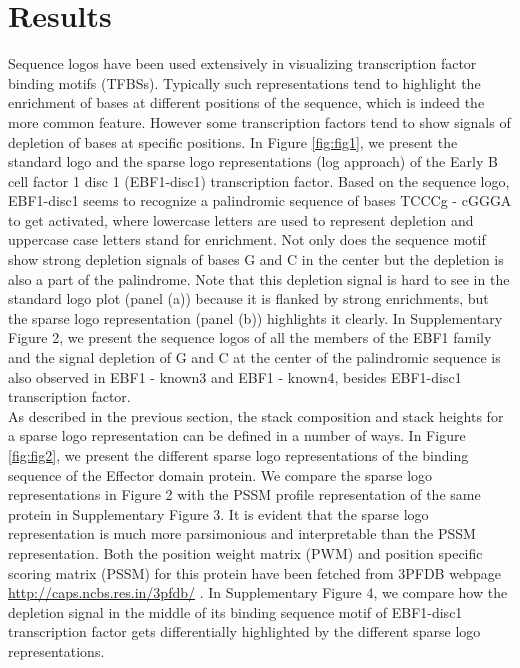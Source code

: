 \documentclass{bmcart}
\begin{document}
\section*{Results}

Sequence logos have been used extensively in visualizing transcription factor binding motifs (TFBSs). Typically such representations tend to highlight the enrichment of bases at different positions of the sequence, which is indeed the more common feature. However some transcription factors tend to show signals of depletion of bases at specific positions. In Figure \ref{fig:fig1}, we present the standard logo and the sparse logo representations (log approach) of the Early B cell factor 1 disc 1 (EBF1-disc1) transcription factor. Based on the sequence logo, EBF1-disc1 seems to recognize a palindromic sequence of bases TCCCg - cGGGA to get activated, where lowercase letters are used to represent depletion and uppercase case letters stand for enrichment.  Not only does the sequence motif show strong depletion signals of bases G and C in the center but the depletion is also a part of the palindrome. Note that this depletion signal is hard to see in the standard logo plot (panel (a)) because it is flanked by strong enrichments, but the sparse logo representation (panel (b)) highlights it clearly.
In Supplementary Figure 2, we present the sequence logos of all the members of the EBF1 family and the signal depletion of G and C at the center of the palindromic sequence is also observed in EBF1 - known3 and EBF1 - known4, besides EBF1-disc1 transcription factor. \\[3 pt]


As described in the previous section, the stack composition and stack heights for a sparse logo representation can be defined in a number of ways. In Figure \ref{fig:fig2}, we present the different sparse logo representations of the binding sequence of the Effector domain protein.  We compare the sparse logo representations in Figure 2 with the PSSM profile representation of the same protein in Supplementary Figure 3. It is evident that the sparse logo representation is much more parsimonious and interpretable than the PSSM representation. Both the position weight matrix (PWM) and position specific scoring matrix (PSSM) for this protein have been fetched from 3PFDB webpage \url{http://caps.ncbs.res.in/3pfdb/} \cite{Shameer2009} \cite{Joseph2014}. In Supplementary Figure 4, we compare how the depletion signal in the middle of its binding sequence motif of EBF1-disc1 transcription factor gets differentially highlighted by the different sparse logo representations. \\ [3 pt]
\end{document}
